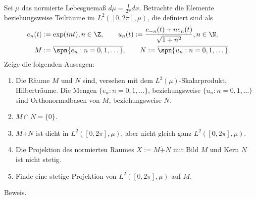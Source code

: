 \begin{exercise}
Sei $\mu$ das normierte Lebesguemaß $d\mu = \frac{1}{2\pi}dx$. Betrachte die Elemente
beziehungsweise Teilräume im $L^2([0,2\pi], \mu)$, die definiert sind als
\begin{align*}
  e_n(t) &:= \exp(int), n \in \Z, \qquad u_n(t) := \frac{e_{-n}(t) + ne_n(t)}{\sqrt{1+n^2}}, n \in \N, \\
  M &:= \overline{\spn\{e_n: n = 0,1,\dots\}}, \qquad N := \overline{\spn\{u_n: n = 0,1,\dots\}}.
\end{align*}
Zeige die folgenden Aussagen:
\begin{enumerate}[label = (\alph*)]
  \item Die Räume $M$ und $N$ sind, versehen mit dem $L^2(\mu)$-Skalarprodukt, Hilberträume.
  Die Mengen $\{e_n: n = 0,1,\dots\}$, beziehungsweise
  $\{u_n: n = 0,1,\dots\}$ sind Orthonormalbasen von $M$, beziehungsweise $N$.
  \item $M \cap N = \{0\}$.
  \item $M \dot+ N$ ist dicht in $L^2([0,2\pi],\mu)$, aber nicht gleich ganz $L^2([0,2\pi],\mu)$.
  \item Die Projektion des normierten Raumes $X := M \dot + N$ mit Bild $M$ und Kern $N$
  ist nicht stetig.
  \item Finde eine stetige Projektion von $L^2([0,2\pi],\mu)$ auf $M$.
\end{enumerate}
\end{exercise}
\begin{solution}
Beweis.
\end{solution}
